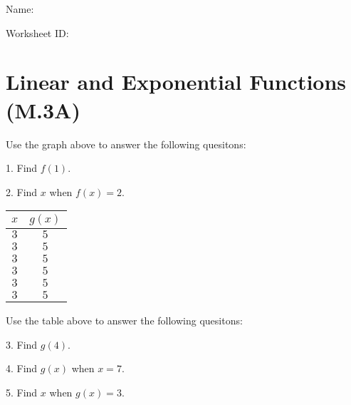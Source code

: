 \documentclass[12pt]{article}
\begin{document}
\begin{flushright}
Name: \underline{\hspace{2.5 in}}
\end{flushright}
\begin{flushright}
Worksheet ID: %
\end{flushright}
\section*{Linear and Exponential Functions (M.3A)}


Use the graph above to answer the following quesitons:

1. Find $f(1)$.

2. Find $x$ when $f(x) = 2$. 

\hline


\begin{tabular}{|c|c|}
\hline 
$x$ & $g(x)$ \tabularnewline
\hline 
\hline 
$3$ & $5$ \tabularnewline
\hline 
$3$ & $5$ \tabularnewline
\hline 
$3$ & $5$ \tabularnewline
\hline 
$3$ & $5$ \tabularnewline
\hline 
$3$ & $5$ \tabularnewline
\hline 
$3$ & $5$ \tabularnewline
\hline 
\end{tabular}

Use the table above to answer the following quesitons:

3. Find $g(4)$.

4. Find $g(x)$ when $x=7$.

5. Find $x$ when $g(x) = 3$.

\hline
\end{document}
